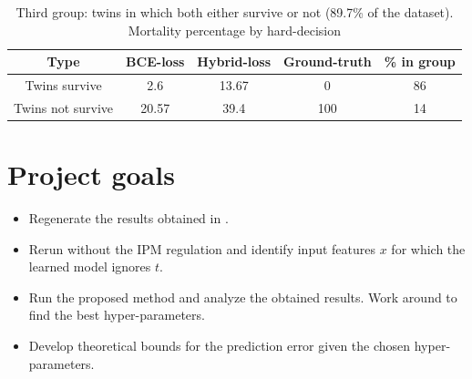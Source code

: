 \documentclass[oneside,12pt]{article}
\begin{document}
%
%
\begin{table}[t]
\centering
 \begin{tabular}{||c | c | c | c | c ||}
 \hline
 Type & BCE-loss & Hybrid-loss & Ground-truth & \% in group \\ [0.5ex] 
 \hline\hline
 Twins survive & 2.6 & 13.67 & 0 & 86\\ 
 \hline
 Twins not survive & 20.57 & 39.4 & 100 & 14\\ [1ex]
 \hline
\end{tabular}
\caption{Third group: twins in which both either survive or not (89.7\% of the dataset). Mortality percentage by hard-decision}
\label{tab:mort3}
\end{table}
%
%
\section*{Project goals}\label{sec:goals}
\begin{itemize}
    \item Regenerate the results obtained in \cite{pmlr-v70-shalit17a}.
    \item Rerun without the IPM regulation and identify input features $x$ for which the learned model ignores $t$.
    \item Run the proposed method and analyze the obtained results. Work around to find the best hyper-parameters. 
    \item Develop theoretical bounds for the prediction error given the chosen hyper-parameters. 
\end{itemize}


\renewcommand{\bibname}{References}           %

\end{document}
